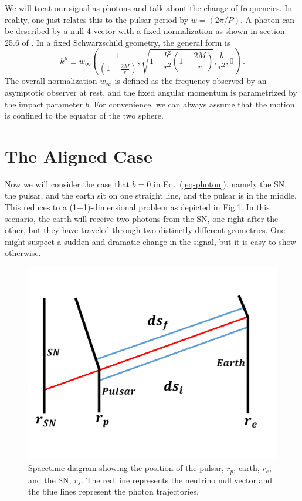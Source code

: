 \documentclass[aps,showpacs,twocolumn,floats,prd,superscriptaddress,nofootinbib]{revtex4}
\begin{document}
We will treat our signal as photons and talk about the change of frequencies. In reality, one just relates this to the pulsar period by $w=(2\pi/P)$. A photon can be described by a null-4-vector with a fixed normalization as shown in section 25.6 of \cite{MTW}. In a fixed Schwarzschild geometry, the general form is
\begin{equation}
	k^\mu \equiv w_{\infty}\left( \frac{1}{(1- \frac{2M}{r})}, \sqrt{ 1 - \frac{b^2}{r^2} \left( 1 - \frac{2M}{r} \right)}, \frac{b}{r^2}, 0 \right)~. \label{eq-photon}	
\end{equation}
The overall normalization $w_{\infty}$ is defined as the frequency observed by an asymptotic observer at rest, and the fixed angular momentum is parametrized by the impact parameter $b$. For convenience, we can always assume that the motion is confined to the equator of the two sphere.

\section{The Aligned Case}
\label{sec-1+1}

Now we will consider the case that $b=0$ in Eq.~(\ref{eq-photon}), namely the SN, the pulsar, and the earth sit on one straight line, and the pulsar is in the middle. This reduces to a (1+1)-dimensional problem as depicted in Fig.\ref{fig:1}. In this scenario, the earth will receive two photons from the SN, one right after the other, but they have traveled through two distinctly different geometries. One might suspect a sudden and dramatic change in the signal, but it is easy to show otherwise.

\begin{figure}[tb!]
\begin{center}
\includegraphics[scale = 0.3]{Image2.pdf}
\caption{Spacetime diagram showing the position of the pulsar, $r_p$, earth, $r_e$, and the SN, $r_s$. The red line represents the neutrino null vector and the blue lines represent the photon trajectories.}
\label{fig:1}
\end{center}
\end{figure}
\end{document}
